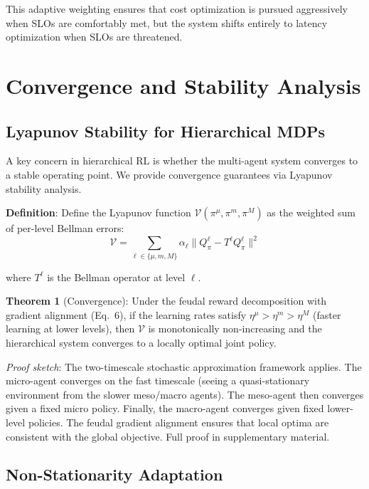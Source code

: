 \documentclass[conference,10pt]{IEEEtran}
\begin{document}
This adaptive weighting ensures that cost optimization is pursued aggressively when SLOs are comfortably met, but the system shifts entirely to latency optimization when SLOs are threatened.

\section{Convergence and Stability Analysis}
\label{sec:convergence}

\subsection{Lyapunov Stability for Hierarchical MDPs}

A key concern in hierarchical RL is whether the multi-agent system converges to a stable operating point. We provide convergence guarantees via Lyapunov stability analysis.

\textbf{Definition}: Define the Lyapunov function $\mathcal{V}(\pi^{\mu}, \pi^{m}, \pi^{M})$ as the weighted sum of per-level Bellman errors:
\begin{equation}
\mathcal{V} = \textstyle\sum_{\ell \in \{\mu,m,M\}} \alpha_\ell \|Q^\ell_\pi - T^\ell Q^\ell_\pi\|^2
\end{equation}

where $T^{\ell}$ is the Bellman operator at level $\ell$.

\textbf{Theorem 1} (Convergence): Under the feudal reward decomposition with gradient alignment (Eq.~6), if the learning rates satisfy $\eta^{\mu} > \eta^{m} > \eta^{M}$ (faster learning at lower levels), then $\mathcal{V}$ is monotonically non-increasing and the hierarchical system converges to a locally optimal joint policy.

\textit{Proof sketch}: The two-timescale stochastic approximation framework applies. The micro-agent converges on the fast timescale (seeing a quasi-stationary environment from the slower meso/macro agents). The meso-agent then converges given a fixed micro policy. Finally, the macro-agent converges given fixed lower-level policies. The feudal gradient alignment ensures that local optima are consistent with the global objective. Full proof in supplementary material.

\subsection{Non-Stationarity Adaptation}
\end{document}

